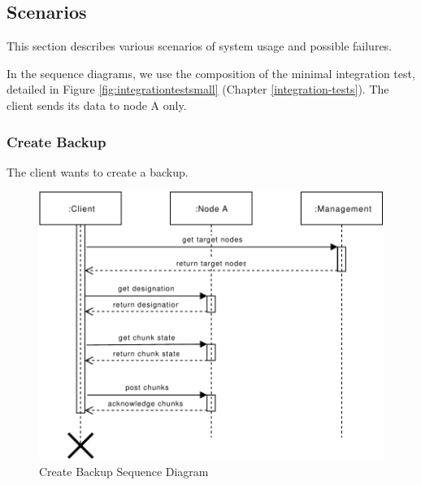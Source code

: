 \subsection{Scenarios}
\label{sec:scenarios}
This section describes various scenarios of \gls{system} usage and possible failures.

In the sequence diagrams, we use the composition of the minimal integration test, detailed in Figure \ref{fig:integrationtestsmall} (Chapter \ref{integration-tests}).
The \gls{client} sends its data to \Gls{node} A only.

\subsubsection{Create Backup}\label{sec:scenario-create-backup}
The \gls{client} wants to create a backup.

\begin{figure}[h]
    \centering
    \includegraphics[width=\linewidth]{resources/create_backup}
    \caption{Create Backup Sequence Diagram}
    \label{fig:create-backup}
\end{figure}

